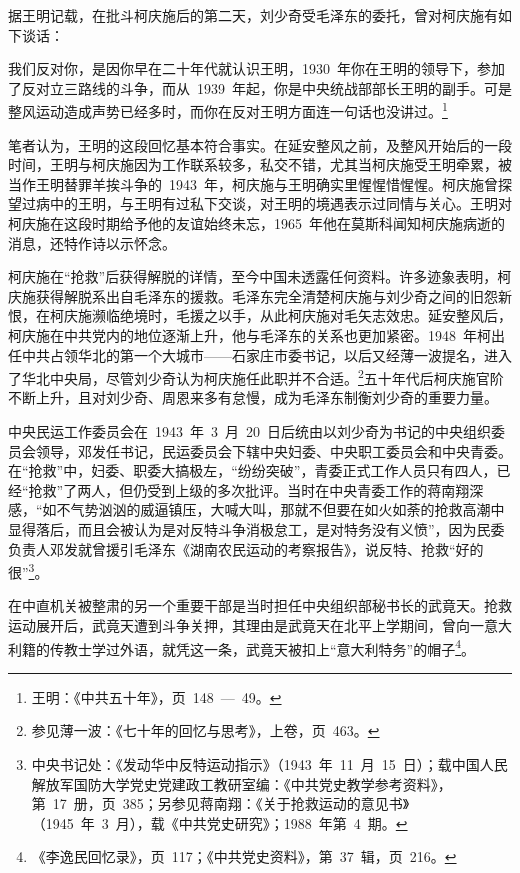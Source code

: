 据王明记载，在批斗柯庆施后的第二天，刘少奇受毛泽东的委托，曾对柯庆施有如下谈话：

\begin{quoting}
我们反对你，是因你早在二十年代就认识王明，1930~年你在王明的领导下，参加了反对立三路线的斗争，而从~1939~年起，你是中央统战部部长王明的副手。可是整风运动造成声势已经多时，而你在反对王明方面连一句话也没讲过。\footnote{王明：《中共五十年》，页~148~—~49。}
\end{quoting}

笔者认为，王明的这段回忆基本符合事实。在延安整风之前，及整风开始后的一段时间，王明与柯庆施因为工作联系较多，私交不错，尤其当柯庆施受王明牵累，被当作王明替罪羊挨斗争的~1943~年，柯庆施与王明确实里惺惺惜惺惺。柯庆施曾探望过病中的王明，与王明有过私下交谈，对王明的境遇表示过同情与关心。王明对柯庆施在这段时期给予他的友谊始终未忘，1965~年他在莫斯科闻知柯庆施病逝的消息，还特作诗以示怀念。

柯庆施在“抢救”后获得解脱的详情，至今中国未透露任何资料。许多迹象表明，柯庆施获得解脱系出自毛泽东的援救。毛泽东完全清楚柯庆施与刘少奇之间的旧怨新恨，在柯庆施濒临绝境时，毛援之以手，从此柯庆施对毛矢志效忠。延安整风后，柯庆施在中共党内的地位逐渐上升，他与毛泽东的关系也更加紧密。1948~年柯出任中共占领华北的第一个大城市——石家庄市委书记，以后又经薄一波提名，进入了华北中央局，尽管刘少奇认为柯庆施任此职并不合适。\footnote{参见薄一波：《七十年的回忆与思考》，上卷，页~463。}五十年代后柯庆施官阶不断上升，且对刘少奇、周恩来多有怠慢，成为毛泽东制衡刘少奇的重要力量。

中央民运工作委员会在~1943~年~3~月~20~日后统由以刘少奇为书记的中央组织委员会领导，邓发任书记，民运委员会下辖中央妇委、中央职工委员会和中央青委。在“抢救”中，妇委、职委大搞极左，“纷纷突破”，青委正式工作人员只有四人，已经“抢救”了两人，但仍受到上级的多次批评。当时在中央青委工作的蒋南翔深感，“如不气势汹汹的威逼镇压，大喊大叫，那就不但要在如火如荼的抢救高潮中显得落后，而且会被认为是对反特斗争消极怠工，是对特务没有义愤”，因为民委负责人邓发就曾援引毛泽东《湖南农民运动的考察报告》，说反特、抢救“好的很”\footnote{中央书记处：《发动华中反特运动指示》（1943~年~11~月~15~日）；载中国人民解放军国防大学党史党建政工教研室编：《中共党史教学参考资料》，第~17~册，页~385；另参见蒋南翔：《关于抢救运动的意见书》（1945~年~3~月），载《中共党史研究》；1988~年第~4~期。}。

在中直机关被整肃的另一个重要干部是当时担任中央组织部秘书长的武竟天。抢救运动展开后，武竟天遭到斗争关押，其理由是武竟天在北平上学期间，曾向一意大利籍的传教士学过外语，就凭这一条，武竟天被扣上“意大利特务”的帽子\footnote{《李逸民回忆录》，页~117；《中共党史资料》，第~37~辑，页~216。}。

